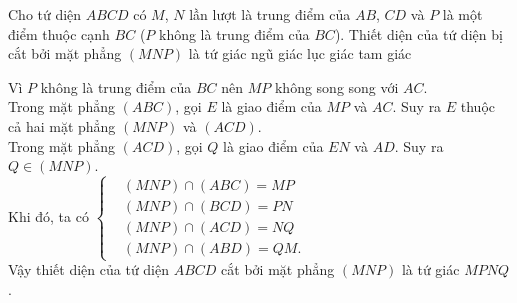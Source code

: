 \begin{ex}%
Cho tứ diện $ABCD$ có $M$, $N$ lần lượt là trung điểm của $AB$, $CD$ và $P$ là một điểm thuộc cạnh $BC$ ($P$ không là trung điểm của $BC$). Thiết diện của tứ diện bị cắt bởi mặt phẳng $(MNP)$ là
\choice
{\True tứ giác}
{ngũ giác}
{lục giác}
{tam giác}
\loigiai
{
\immini
{
Vì $P$ không là trung điểm của $BC$ nên $MP$ không song song với $AC$.\\
Trong mặt phẳng $(ABC)$, gọi $E$ là giao điểm của $MP$ và $AC$. Suy ra $E$ thuộc cả hai mặt phẳng $(MNP)$ và $(ACD)$.\\
Trong mặt phẳng $(ACD)$, gọi $Q$ là giao điểm của $EN$ và $AD$. Suy ra $Q\in (MNP)$.\\
Khi đó, ta có $\left\{\begin{aligned}&(MNP)\cap (ABC)=MP \\&(MNP)\cap (BCD)=PN \\&(MNP)\cap (ACD)=NQ \\&(MNP)\cap (ABD)=QM.\end{aligned}\right.$\\
Vậy thiết diện của tứ diện $ABCD$ cắt bởi mặt phẳng $(MNP)$ là tứ giác $MPNQ$.
}
{
}
}
\end{ex}

